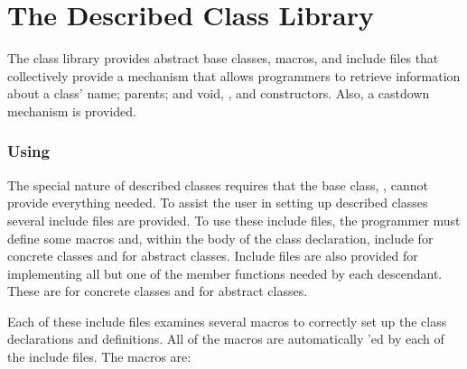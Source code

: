 
\chapter{The Described Class Library}

The class library provides abstract base classes, macros,
and include files that collectively provide a mechanism that
allows programmers to retrieve information about a class'
name; parents; and void, \srccd{\&}, and
\srccd{\&} constructors.  Also, a castdown
mechanism is provided.

\subsection{Using }

The special nature of described classes requires that the base class,
, cannot provide everything needed.  To assist the
user in setting up described classes several include files are provided.
To use these include files, the programmer must define some 
macros and, within the body of the class declaration,
include  for concrete classes and
 for abstract classes.  Include files
are also provided for implementing all but one of the member functions
needed by each  descendant.  These are
 for concrete classes and
 for abstract classes.

Each of these include files examines several 
macros to correctly set up the class declarations and definitions.
All of the macros are automatically
'ed by each of the include files.
The macros are:

